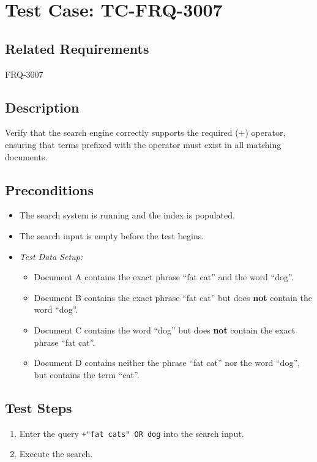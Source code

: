 \documentclass{article}
\begin{document}
\section{Test Case: TC-FRQ-3007}

\subsection*{Related Requirements}
FRQ-3007

\subsection*{Description}
Verify that the search engine correctly supports the required (+) operator, ensuring that terms prefixed with the operator must exist in all matching documents.

\subsection*{Preconditions}
\begin{itemize}
  \item The search system is running and the index is populated.
  \item The search input is empty before the test begins.
  \item[] \textit{Test Data Setup:}
  \begin{itemize}
      \item Document A contains the exact phrase ``fat cat'' and the word ``dog''.
      \item Document B contains the exact phrase ``fat cat'' but does \textbf{not} contain the word ``dog''.
      \item Document C contains the word ``dog'' but does \textbf{not} contain the exact phrase ``fat cat''.
      \item Document D contains neither the phrase ``fat cat'' nor the word ``dog'', but contains the term ``cat''.
  \end{itemize}
\end{itemize}

\subsection*{Test Steps}
\begin{enumerate}
 \item Enter the query \texttt{+"fat cats" OR dog} into the search input.
  \item Execute the search.
\end{enumerate}
\end{document}
